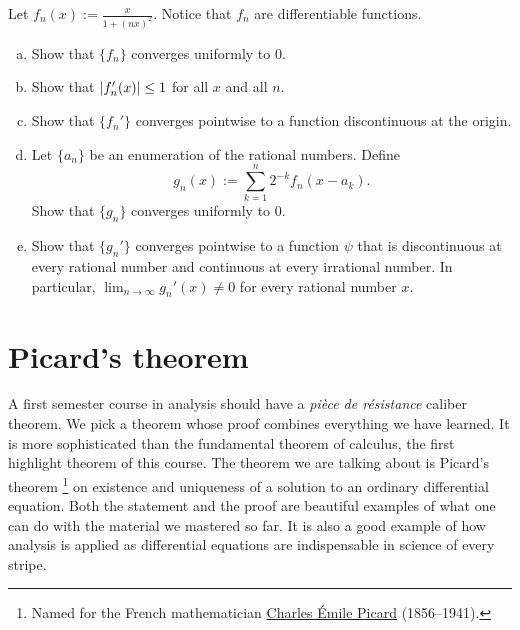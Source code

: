 \begin{exercise}
Let $f_n(x) := \frac{x}{1+{(nx)}^2}$.  Notice that $f_n$ are differentiable
functions.
\begin{enumerate}[a)]
\item
Show that $\{ f_n \}$ converges uniformly to 0.
\item
Show that $\lvert {f_n'(x)} \rvert \leq 1$ for all $x$ and all $n$.
\item
Show that $\{ f_n' \}$ converges pointwise to a function discontinuous at
the origin.
\item
Let $\{ a_n \}$ be an enumeration of the rational numbers.
Define
\begin{equation*}
g_n(x) := \sum_{k=1}^n 2^{-k} f_n(x-a_k) .
\end{equation*}
Show that $\{ g_n \}$ converges uniformly to 0.
\item
Show that $\{ g_n' \}$ converges pointwise to a function $\psi$ that
is discontinuous at every rational number and continuous at every
irrational number.  In particular, $\lim_{n\to\infty} g_n'(x) \not= 0$ for
every rational number $x$.
\end{enumerate}
\end{exercise}


\sectionnewpage
\section{Picard's theorem}
\label{sec:picard}


A first semester course in analysis should have
a \emph{pi\`ece de r\'esistance} caliber
theorem.  We pick a theorem whose proof combines everything we have
learned.  It is more sophisticated than the fundamental theorem of calculus,
the first highlight theorem of this course.  The
theorem we are talking about is Picard's
theorem%
\footnote{Named for the French mathematician
\href{https://en.wikipedia.org/wiki/\%C3\%89mile_Picard}{Charles \'Emile Picard}
(1856--1941).}
on existence and uniqueness of a solution to an ordinary differential equation.
Both the statement and the proof are beautiful examples of what one can do
with the material we mastered so far.  It is also a good example of how analysis is
applied as differential equations are indispensable in science of every
stripe.

